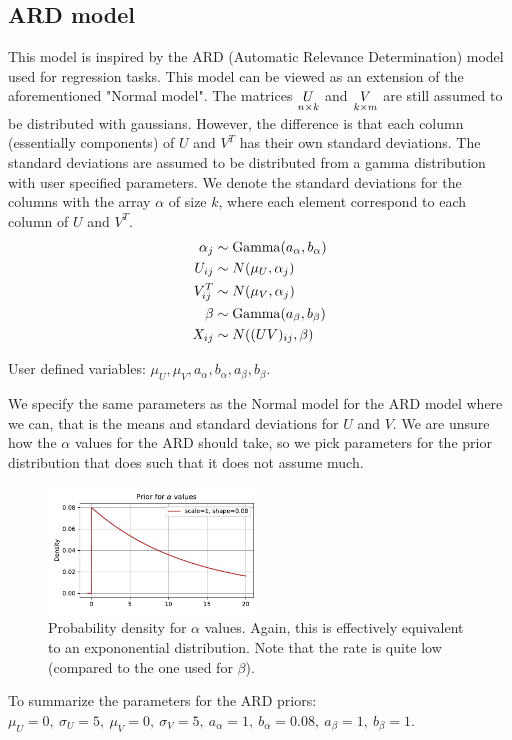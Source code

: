 \documentclass[12pt]{article}
\begin{document}
    \subsection{ARD model}
    This model is inspired by the ARD (Automatic Relevance Determination) model used for regression tasks. This model can be viewed as an extension of the aforementioned "Normal model". The matrices $\underset{n \times k}{U}$ and $\underset{k \times m}{V}$ are still assumed to be distributed with gaussians. However, the difference is that each column (essentially components) of $U$ and $V^T$ has their own standard deviations. The standard deviations are assumed to be distributed from a gamma distribution with user specified parameters. We denote the standard deviations for the columns with the array $\alpha$ of size $k$, where each element correspond to each column of $U$ and $V^T$.
    \begin{align*}
        \alpha_{j}  &\sim \operatorname{Gamma}(a_\alpha, b_\alpha) \\
        U_{ij}  &\sim N(\mu_U, \alpha_j) \\
        V^T_{ij}  &\sim N(\mu_V, \alpha_j) \\
        \beta  &\sim \operatorname{Gamma}(a_\beta, b_\beta) \\
        X_{ij} &\sim N((UV)_{ij}, \beta)
    \end{align*}

    User defined variables: $\mu_U, \mu_V, a_\alpha, b_\alpha, a_\beta, b_\beta$.
    
    \vspace{3mm}
    We specify the same parameters as the Normal model for the ARD model where we can, that is the means and standard deviations for $U$ and $V$. We are unsure how the $\alpha$ values for the ARD should take, so we pick parameters for the prior distribution that does such that it does not assume much. 
    \begin{figure}[H]
        \centering
        \includegraphics[width=0.5\textwidth]{alphaprior.pdf}
        \caption{Probability density for $\alpha$ values. Again, this is effectively equivalent to an expononential distribution. Note that the rate is quite low (compared to the one used for $\beta$).}
    \end{figure}
    To summarize the parameters for the ARD priors: $\mu_U=0,\ \sigma_U=5,\ \mu_V=0,\ \sigma_V=5,\ a_\alpha=1,\ b_\alpha=0.08, \ a_\beta=1,\ b_\beta=1$.
\end{document}
